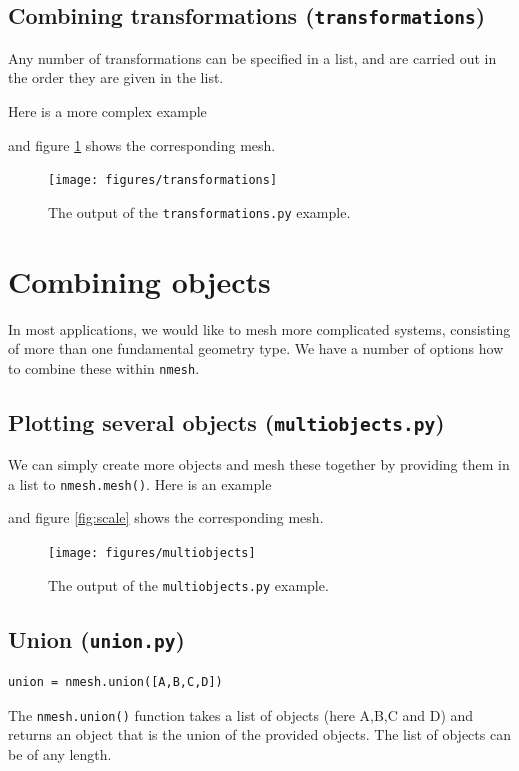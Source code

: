 \documentclass[10pt,a4paper]{book}
\newcommand{\py}[1]{\texttt{\color{blue}#1}}
\newcommand{\nmesh}{\texttt{nmesh}}
\begin{document}
\subsection{Combining transformations (\texttt{transformations})}

Any number of transformations can be specified in a list, and are
carried out in the order they are given in the list.

Here is a more complex example

and figure \ref{fig:transformations} shows the corresponding mesh.
\begin{figure}[tbhp]
\centerline{\texttt{[image: figures/transformations]}}
\caption{\label{fig:transformations} The output of the \py{transformations.py} example.}
\end{figure}

\section{Combining objects}
\label{sec:combiningobjects}
In most applications, we would like to mesh more complicated systems,
consisting of more than one fundamental geometry type. We have a
number of options how to combine these within \nmesh.

\subsection{Plotting several objects (\texttt{multiobjects.py})}
\label{sec:multiobjects}

We can simply create more objects and mesh these together by providing
them in a list to \py{nmesh.mesh()}. Here is an example

and figure \ref{fig:scale} shows the corresponding mesh.
\begin{figure}[tbhp]
\centerline{\texttt{[image: figures/multiobjects]}}
\caption{\label{fig:multiobjects} The output of the \py{multiobjects.py} example.}
\end{figure}

\subsection{Union (\texttt{union.py})}
\begin{lstlisting}
union = nmesh.union([A,B,C,D])
\end{lstlisting}
The \py{nmesh.union()} function takes a list of objects (here A,B,C and D) and returns an object that is the union of the provided objects. The list of objects can be of any length. 
\end{document}
